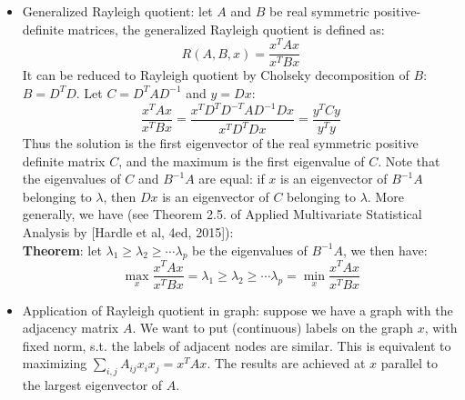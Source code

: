 \documentclass{report}
\begin{document}
\begin{itemize}
\item Generalized Rayleigh quotient: let $A$ and $B$ be real symmetric positive-definite matrices, the generalized Rayleigh quotient is defined as: 
\begin{equation}
R(A,B,x) = \frac{x^T A x}{x^T B x}	
\end{equation}
It can be reduced to Rayleigh quotient by Cholseky decomposition of $B$: $B = D^T D$. Let $C = D^{T} A D^{-1}$ and $y = Dx$: 
\begin{equation}
\frac{x^T A x}{x^T B x} = \frac{x^T D^T D^{-T} A D^{-1} D x}{x^T D^T D x}	= \frac{y^T C y}{y^T y}
\end{equation}
Thus the solution is the first eigenvector of the real symmetric positive definite matrix $C$, and the maximum is the first eigenvalue of $C$. Note that the eigenvalues of $C$ and $B^{-1}A$ are equal: if $x$ is an eigenvector of $B^{-1}A$ belonging to $\lambda$, then $Dx$ is an eigenvector of $C$ belonging to $\lambda$. More generally, we have (see Theorem 2.5. of Applied Multivariate Statistical Analysis by [Hardle et al, 4ed, 2015]): \\
\textbf{Theorem}: let $\lambda_1 \geq \lambda_2 \geq \cdots \lambda_p$ be the eigenvalues of $B^{-1}A$, we then have: 
\begin{equation}
\max_x \frac{x^T A x}{x^T B x} = \lambda_1 \geq \lambda_2 \geq \cdots \lambda_p = \min_x \frac{x^T A x}{x^T B x}
\end{equation}

\item Application of Rayleigh quotient in graph: suppose we have a graph with the adjacency matrix $A$. We want to put (continuous) labels on the graph $x$, with fixed norm, s.t. the labels of adjacent nodes are similar. This is equivalent to maximizing $\sum_{i,j} A_{ij} x_i x_j = x^T A x$. The results are achieved at $x$ parallel to the largest eigenvector of $A$. 

\end{itemize}
\end{document}
